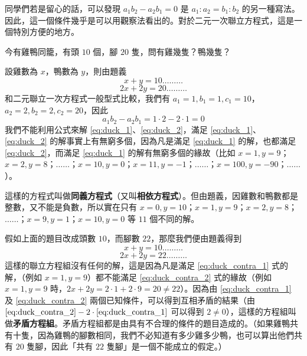同學們若是留心的話，可以發現 $a_1 b_2 - a_2 b_1 = 0$ 是 $a_1 : a_2 = b_1 : b_2$ 的另一種寫法。因此，這一個條件幾乎是可以用觀察法看出的。對於二元一次聯立方程式，這是一個特別方便的地方。

\begin{example}\label{ex:4-4-1}
今有雞鴨同籠，有頭 $10$ 個，腳 $20$ 隻，問有雞幾隻？鴨幾隻？
\end{example}

\begin{solution*}
設雞數為 $x$，鴨數為 $y$，則由題義
\begin{equation}\label{eq:duck_1}
  x+y = 10 \dots\dots\dots
\end{equation}
\begin{equation}\label{eq:duck_2}
  2x+2y = 20 \dots\dots\dots
\end{equation}
和二元聯立一次方程式一般型式比較，我們有 $a_1=1, b_1=1, c_1=10$，$a_2=2, b_2=2, c_2=20$，因此
\begin{equation*}
  a_1 b_2 - a_2 b_1 = 1 \cdot 2 - 2 \cdot 1 = 0
\end{equation*}
我們不能利用公式來解 \eqref{eq:duck_1}、\eqref{eq:duck_2}，滿足 \eqref{eq:duck_1}、\eqref{eq:duck_2} 的解事實上有無窮多個，因為凡是滿足 \eqref{eq:duck_1} 的解，也都滿足 \eqref{eq:duck_2}，而滿足 \eqref{eq:duck_1} 的解有無窮多個的緣故（比如 $x=1, y=9$；$x=2, y=8$；$\dots\dots$；$x=10, y=0$；$x=11, y=-1$；$\dots\dots$；$x=100, y=-90$；$\dots\dots$）。

這樣的方程式叫做\textbf{同義方程式}（又叫\textbf{相依方程式}）。但由題義，因雞數和鴨數都是整數，又不能是負數，所以實在只有 $x=0, y=10$；$x=1, y=9$；$x=2, y=8$；$\dots\dots$；$x=9, y=1$；$x=10, y=0$ 等 $11$ 個不同的解。

假如上面的題目改成頭數 $10$，而腳數 $22$，那麼我們便由題義得到
\begin{equation}\label{eq:duck_contra_1}
  x+y = 10 \dots\dots\dots
\end{equation}
\begin{equation}\label{eq:duck_contra_2}
  2x+2y = 22 \dots\dots\dots
\end{equation}
這樣的聯立方程組沒有任何的解，這是因為凡是滿足 \eqref{eq:duck_contra_1} 式的解，（例如 $x=1, y=9$）都不能滿足 \eqref{eq:duck_contra_2} 式的緣故（例如 $x=1, y=9$ 時，$2x+2y = 2 \cdot 1 + 2 \cdot 9 = 20 \neq 22$）。因為由 \eqref{eq:duck_contra_1} 及 \eqref{eq:duck_contra_2} 兩個已知條件，可以得到互相矛盾的結果（由 $\eqref{eq:duck_contra_2} - 2 \cdot \eqref{eq:duck_contra_1}$ 可以得到 $2 \neq 0$），這樣的方程組叫做\textbf{矛盾方程組}。矛盾方程組都是由具有不合理的條件的題目造成的。（如果雞鴨共有十隻，因為雞鴨的腳數相同，我們不必知道有多少雞多少鴨，也可以算出他們共有 $20$ 隻腳，因此「共有 $22$ 隻腳」是一個不能成立的假定。）
\end{solution*}


